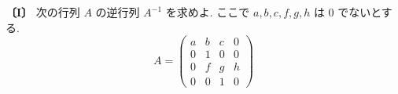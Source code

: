 \noindent\textbf{〔I〕}
次の行列 $A$ の逆行列 $A^{-1}$ を求めよ. ここで $a,b,c,f,g,h$ は $0$ でないとする.
\[
A=\begin{pmatrix}
a & b & c & 0\\
0 & 1 & 0 & 0\\
0 & f & g & h\\
0 & 0 & 1 & 0
\end{pmatrix}
\]

